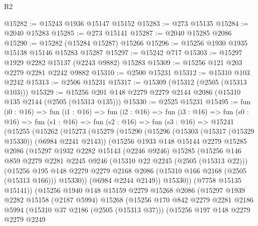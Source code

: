 \begin{lexlean}{R2}
\begin{coremodule}
@15282 := @15243 @1936 @15147 @15152
@15283 := @273 @15135
@15284 := @2040 @15283
@15285 := @273 @15141
@15287 := @2040 @15285 @2086
@15290 := @15282 (@15284 @15287) @15266
@15296 := @15256 @1930 @1935 @15138 @15146 @15283 @15287
@15297 := @15242 @717
@15303 := @15297 @1929 @2282 @15137 (@2243 @9882) @15283
@15309 := @15256 @121 @203 @2279 @2281 @2242 @9882
@15310 := @2500 @15231
@15312 := @15310 @103 @2242
@15313 := @2506 @15231
@15317 := @15309 (@15312 (@2505 (@15313 @103)))
@15329 := @15256 @201 @148 @2279 @2279 @2144 @2086 (@15310 @135 @2144 (@2505 (@15313 @135)))
@15330 := @2525 @15231
@15495 := fun (i0 : @16) =>
  fun (i1 : @16) =>
  fun (i2 : @16) =>
  fun (i3 : @16) =>
  fun (s0 : @16) =>
  fun (s1 : @16) =>
  fun (s2 : @16) =>
  fun (s3 : @16) =>
  @15241
    (@15255
      (@15262
        (@15273
          (@15279
            (@15290
              (@15296
                (@15303 (@15317 (@15329 @15330)) (@6984 @2241 @2143))
                (@15256
                  @1933
                  @148
                  @15144
                  @2279
                  @15285
                  @2086
                  (@15297
                    @1932
                    @2282
                    @15143
                    (@2246 @9246)
                    @15285
                    (@15256
                      @146
                      @859
                      @2279
                      @2281
                      @2245
                      @9246
                      (@15310 @22 @2245 (@2505 (@15313 @22)))
                      (@15256
                        @195
                        @148
                        @2279
                        @2279
                        @2168
                        @2086
                        (@15310 @166 @2168 (@2505 (@15313 @166)))
                        @15330))
                    (@6984 @2244 @2149))
                  @15330))
              (@7758 @15135 @15141))
            (@15256
              @1940
              @148
              @15159
              @2279
              @15268
              @2086
              (@15297
                @1939
                @2282
                @15158
                (@2187 @5994)
                @15268
                (@15256
                  @170
                  @842
                  @2279
                  @2281
                  @2186
                  @5994
                  (@15310 @37 @2186 (@2505 (@15313 @37)))
                  (@15256
                    @197
                    @148
                    @2279
                    @2279
                    @2249

\end{coremodule}
\end{lexlean}
